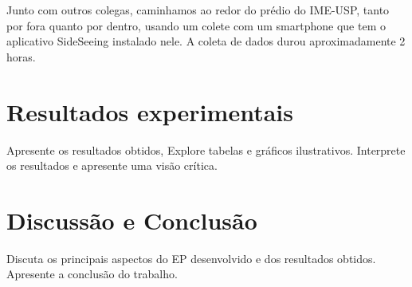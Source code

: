 \documentclass{article}
\begin{document}
Junto com outros colegas, caminhamos ao redor do prédio do IME-USP, tanto por fora quanto por
dentro, usando um colete com um smartphone que tem o aplicativo SideSeeing instalado nele. A coleta
de dados durou aproximadamente 2 horas.  

\section{Resultados experimentais}

Apresente os resultados obtidos, Explore tabelas e gráficos ilustrativos. Interprete os resultados e apresente uma visão crítica.

\section{Discussão e Conclusão}

Discuta os principais aspectos do EP desenvolvido e dos resultados obtidos. Apresente a conclusão do trabalho.
\end{document}
